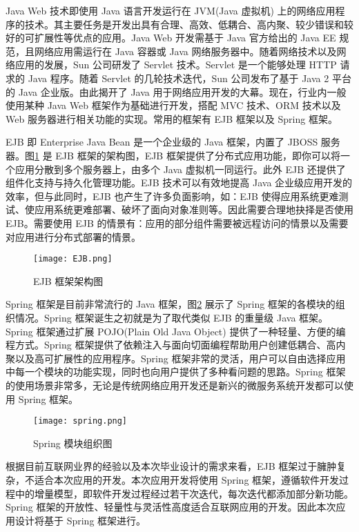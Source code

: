 Java Web 技术即使用 Java 语言开发运行在 JVM(Java 虚拟机) 上的网络应用程序的技术。其主要任务是开发出具有合理、高效、低耦合、高内聚、较少错误和较好的可扩展性等优点的应用。Java Web 开发需基于 Java 官方给出的 Java EE 规范，且网络应用需运行在 Java 容器或 Java 网络服务器中。随着网络技术以及网络应用的发展，Sun 公司研发了 Servlet 技术。Servlet 是一个能够处理 HTTP 请求的 Java 程序。随着 Servlet 的几轮技术迭代，Sun 公司发布了基于 Java 2 平台的 Java 企业版。由此揭开了 Java 用于网络应用开发的大幕。现在，行业内一般使用某种 Java Web 框架作为基础进行开发，搭配 MVC 技术、ORM 技术以及 Web 服务器进行相关功能的实现。常用的框架有 EJB 框架以及 Spring 框架。

EJB 即 Enterprise Java Bean 是一个企业级的 Java 框架，内置了 JBOSS 服务器。图\ref{fig:ejb} 是 EJB 框架的架构图，EJB 框架提供了分布式应用功能，即你可以将一个应用分散到多个服务器上，由多个 Java 虚拟机一同运行。此外 EJB 还提供了组件化支持与持久化管理功能。EJB 技术可以有效地提高 Java 企业级应用开发的效率，但与此同时，EJB 也产生了许多负面影响，如：EJB 使得应用系统更难测试、使应用系统更难部署、破坏了面向对象准则等。因此需要合理地抉择是否使用 EJB。需要使用 EJB 的情景有：应用的部分组件需要被远程访问的情景以及需要对应用进行分布式部署的情景。

\begin{figure}[!ht]
    \centering
    \texttt{[image: EJB.png]}
    \caption{EJB 框架架构图}
    \label{fig:ejb}
\end{figure}

Spring 框架是目前非常流行的 Java 框架，图\ref{fig:spring} 展示了 Spring 框架的各模块的组织情况。Spring 框架诞生之初就是为了取代类似 EJB 的重量级 Java 框架。Spring 框架通过扩展 POJO(Plain Old Java Object) 提供了一种轻量、方便的编程方式。Spring 框架提供了依赖注入与面向切面编程帮助用户创建低耦合、高内聚以及高可扩展性的应用程序。Spring 框架非常的灵活，用户可以自由选择应用中每一个模块的功能实现，同时也向用户提供了多种看问题的思路。Spring 框架的使用场景非常多，无论是传统网络应用开发还是新兴的微服务系统开发都可以使用 Spring 框架。

\begin{figure}[!ht]
    \centering
    \texttt{[image: spring.png]}
    \caption{Spring 模块组织图}
    \label{fig:spring}
\end{figure}

根据目前互联网业界的经验以及本次毕业设计的需求来看，EJB 框架过于臃肿复杂，不适合本次应用的开发。本次应用开发将使用 Spring 框架，遵循软件开发过程中的增量模型，即软件开发过程经过若干次迭代，每次迭代都添加部分新功能。Spring 框架的开放性、轻量性与灵活性高度适合互联网应用的开发。因此本次应用设计将基于 Spring 框架进行。


